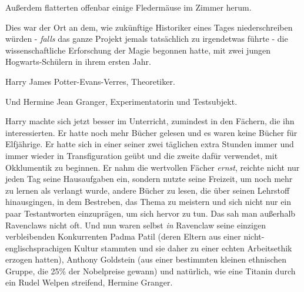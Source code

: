 Außerdem flatterten offenbar einige Fledermäuse im Zimmer herum.

Dies war der Ort an dem, wie zukünftige Historiker eines Tages niederschreiben würden - \emph{falls} das ganze Projekt jemals tatsächlich zu irgendetwas führte - die wissenschaftliche Erforschung der Magie begonnen hatte, mit zwei jungen Hogwarts-Schülern in ihrem ersten Jahr.

Harry James Potter-Evans-Verres, Theoretiker.

Und Hermine Jean Granger, Experimentatorin und Testsubjekt.

Harry machte sich jetzt besser im Unterricht, zumindest in den Fächern, die ihn interessierten. Er hatte noch mehr Bücher gelesen und es waren keine Bücher für Elfjährige. Er hatte sich in einer seiner zwei täglichen extra Stunden immer und immer wieder in Transfiguration geübt und die zweite dafür verwendet, mit Okklumentik zu beginnen. Er nahm die wertvollen Fächer \emph{ernst}, reichte nicht nur jeden Tag seine Hausaufgaben ein, sondern nutzte seine Freizeit, um noch mehr zu lernen als verlangt wurde, andere Bücher zu lesen, die über seinen Lehrstoff hinausgingen, in dem Bestreben, das Thema zu meistern und sich nicht nur ein paar Testantworten einzuprägen, um sich hervor zu tun. Das sah man außerhalb Ravenclaws nicht oft. Und nun waren selbst \emph{in} Ravenclaw seine einzigen verbleibenden Konkurrenten Padma Patil (deren Eltern aus einer nicht-englischsprachigen Kultur stammten und sie daher zu einer echten Arbeitsethik erzogen hatten), Anthony Goldstein (aus einer bestimmten kleinen ethnischen Gruppe, die 25\% der Nobelpreise gewann) und natürlich, wie eine Titanin durch ein Rudel Welpen streifend, Hermine Granger.

